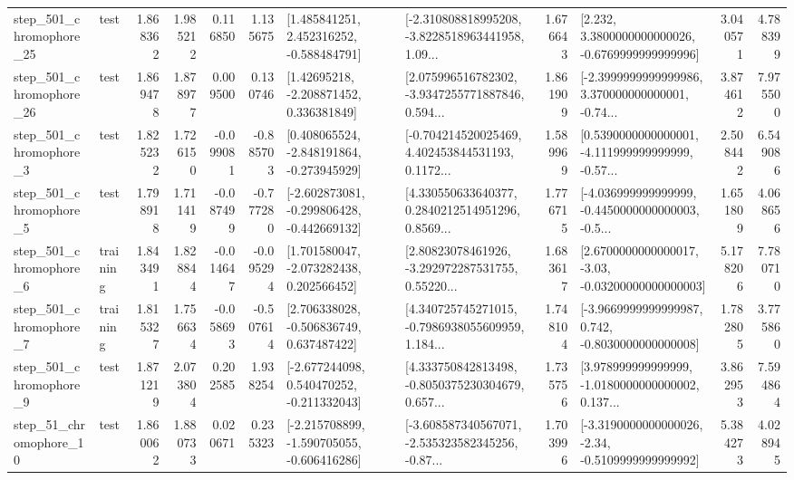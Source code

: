 \begin{tabular}{llrrrrllrlrr}
  step\_501\_chromophore\_25 &      test &      1.868362 &    1.985212 &      0.116850 &  1.135675 &    [1.485841251, 2.452316252, -0.588484791] &  [-2.310808818995208, -3.8228518963441958, 1.09... &       1.676643 &   [2.232, 3.3800000000000026, -0.6769999999999996] &            3.040571 &          4.788399 \\
  step\_501\_chromophore\_26 &      test &      1.869478 &    1.878977 &      0.009500 &  0.130746 &     [1.42695218, -2.208871452, 0.336381849] &  [2.075996516782302, -3.9347255771887846, 0.594... &       1.861909 &  [-2.3999999999999986, 3.370000000000001, -0.74... &            3.874612 &          7.975500 \\
   step\_501\_chromophore\_3 &      test &      1.825232 &    1.726150 &     -0.099081 & -0.885703 &   [0.408065524, -2.848191864, -0.273945929] &  [-0.704214520025469, 4.402453844531193, 0.1172... &       1.589969 &  [0.5390000000000001, -4.111999999999999, -0.57... &            2.508442 &          6.549086 \\
   step\_501\_chromophore\_5 &      test &      1.798918 &    1.711419 &     -0.087499 & -0.777280 &  [-2.602873081, -0.299806428, -0.442669132] &  [4.330550633640377, 0.2840212514951296, 0.8569... &       1.776715 &  [-4.036999999999999, -0.4450000000000003, -0.5... &            1.651809 &          4.068656 \\
   step\_501\_chromophore\_6 &  training &      1.843491 &    1.828844 &     -0.014647 & -0.095294 &    [1.701580047, -2.073282438, 0.202566452] &  [2.80823078461926, -3.292972287531755, 0.55220... &       1.683617 &  [2.6700000000000017, -3.03, -0.03200000000000003] &            5.178206 &          7.780710 \\
   step\_501\_chromophore\_7 &  training &      1.815327 &    1.756634 &     -0.058693 & -0.507614 &    [2.706338028, -0.506836749, 0.637487422] &  [4.340725745271015, -0.7986938055609959, 1.184... &       1.748104 &  [-3.9669999999999987, 0.742, -0.8030000000000008] &            1.782805 &          3.775860 \\
   step\_501\_chromophore\_9 &      test &      1.871219 &    2.073804 &      0.202585 &  1.938254 &   [-2.677244098, 0.540470252, -0.211332043] &  [4.333750842813498, -0.8050375230304679, 0.657... &       1.735756 &  [3.978999999999999, -1.0180000000000002, 0.137... &            3.862953 &          7.594864 \\
   step\_51\_chromophore\_10 &      test &      1.860062 &    1.880733 &      0.020671 &  0.235323 &  [-2.215708899, -1.590705055, -0.606416286] &  [-3.608587340567071, -2.535323582345256, -0.87... &       1.703996 &  [-3.3190000000000026, -2.34, -0.5109999999999992] &            5.384273 &          4.028945 \\

\end{tabular}
